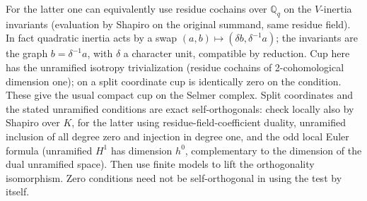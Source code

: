 For the latter one can equivalently use residue cochains over \(\mathbb Q_q\) on the \(V\)-inertia invariants (evaluation by Shapiro on the original summand, same residue field). In fact quadratic inertia acts by a swap \((a,b)\mapsto(\delta b,\delta^{-1}a)\); the invariants are the graph \(b=\delta^{-1}a\), with \(\delta\) a character unit, compatible by reduction. Cup here has the unramified isotropy trivialization (residue cochains of 2-cohomological dimension one); on a split coordinate cup is identically zero on the condition. These give the usual compact cup on the Selmer complex. Split coordinates and the stated unramified conditions are exact self-orthogonals: check locally also by Shapiro over \(K\), for the latter using residue-field-coefficient duality, unramified inclusion of all degree zero and injection in degree one, and the odd local Euler formula (unramified \(H^1\) has dimension \(h^0\), complementary to the dimension of the dual unramified space). Then use finite models to lift the orthogonality isomorphism. Zero conditions need not be self-orthogonal in using the test by itself.

